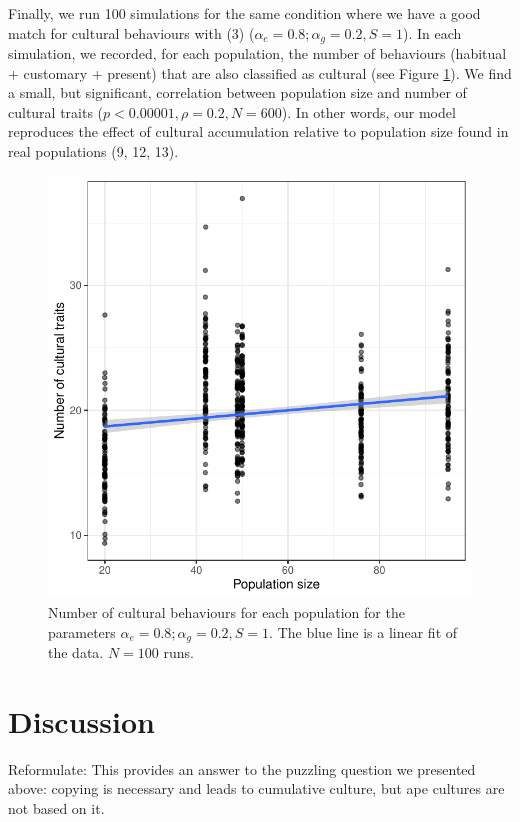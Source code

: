 \documentclass[9pt,twocolumn,twoside,]{pnas-new}
\begin{document}
Finally, we run 100 simulations for the same condition where we have a
good match for cultural behaviours with (3)
(\(\alpha_e=0.8;\alpha_g=0.2, S=1\)). In each simulation, we recorded,
for each population, the number of behaviours (habitual + customary +
present) that are also classified as cultural (see Figure
\ref{Figure4}). We find a small, but significant, correlation between
population size and number of cultural traits
(\(p<0.00001,\rho=0.2,N=600\)). In other words, our model reproduces the
effect of cultural accumulation relative to population size found in
real populations (9, 12, 13).

\begin{figure}[h!]
\begin{center}
\includegraphics[width=11.4cm]{figures/figure_4.pdf}
\caption{Number of cultural behaviours for each population for the parameters $\alpha_e=0.8;\alpha_g=0.2,S=1$. The blue line is a linear fit of the data. $N=100$ runs.}
\label{Figure4}
\end{center}
\end{figure}

\section*{Discussion}\label{discussion}

Reformulate: This provides an answer to the puzzling question we
presented above: copying is necessary and leads to cumulative culture,
but ape cultures are not based on it.
\end{document}
